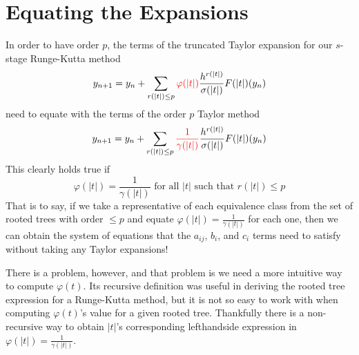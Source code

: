 \documentclass[12pt]{amsart}
\def \red{\textcolor{red}}
\theoremstyle{definition}
\begin{document}
  \section{Equating the Expansions}
  In order to have order $p$, the terms of the truncated Taylor expansion for our $s$-stage Runge-Kutta method
  $$y_{n + 1} = y_n + \sum_{r(|t|) \le p}{\red{\varphi(|t|)} \frac{h^{r(|t|)}}{\sigma(|t|)}F(|t|)(y_n)}$$
  need to equate with the terms of the order $p$ Taylor method
  $$y_{n + 1} = y_n + \sum_{r(|t|) \le p}\red{\frac{1}{\gamma(|t|)}}{\frac{h^{r(|t|)}}{\sigma(|t|)}F(|t|)(y_n)}$$
  This clearly holds true if
  $$\varphi(|t|) = \frac{1}{\gamma(|t|)} \mbox{ for all } |t| \mbox{ such that } r(|t|) \le p$$
  That is to say, if we take a representative of each equivalence class from the set of rooted trees with order $\le p$
  and equate $\varphi(|t|) = \frac{1}{\gamma(|t|)}$ for each one, then we can obtain the system  of equations that the
  $a_{ij}$, $b_i$, and $c_i$ terms need to satisfy without taking any Taylor expansions!
  
  There is a problem, however, and that problem is we need a more intuitive way to compute $\varphi(t)$. Its recursive
  definition was useful in deriving the rooted tree expression for a Runge-Kutta method, but it is not so easy to work with
  when computing $\varphi(t)$'s value for a given rooted tree. Thankfully there is a non-recursive way to obtain $|t|$'s
  corresponding lefthandside expression in $\varphi(|t|) = \frac{1}{\gamma(|t|)}$.
  
\end{document}
